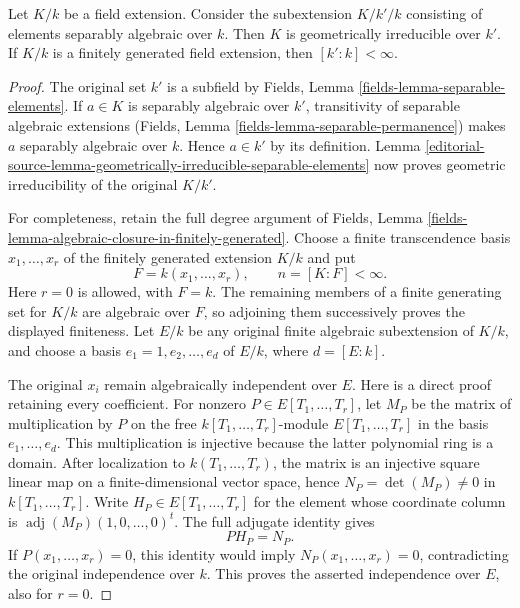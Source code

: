 \begin{lemma}
\label{editorial-source-lemma-make-geometrically-irreducible}
Let $K/k$ be a field extension. Consider the subextension $K/k'/k$ consisting
of elements separably algebraic over $k$. Then $K$ is geometrically irreducible
over $k'$. If $K/k$ is a finitely generated field extension, then
$[k' : k] < \infty$.
\end{lemma}

\begin{proof}
The original set $k'$ is a subfield
by Fields, Lemma \ref{fields-lemma-separable-elements}.
If $a\in K$ is separably algebraic
over $k'$, transitivity of separable
algebraic extensions (Fields, Lemma
\ref{fields-lemma-separable-permanence})
makes $a$ separably algebraic over
$k$. Hence $a\in k'$ by its
definition. Lemma
\ref{editorial-source-lemma-geometrically-irreducible-separable-elements}
now proves geometric irreducibility
of the original $K/k'$.

For completeness, retain the full
degree argument of Fields, Lemma
\ref{fields-lemma-algebraic-closure-in-finitely-generated}.
Choose a finite transcendence basis
$x_1,\ldots,x_r$ of the finitely
generated extension $K/k$ and put
$$
F=k(x_1,\ldots,x_r),\qquad n=[K:F]<\infty.
$$
Here $r=0$ is allowed, with $F=k$.
The remaining members of a finite
generating set for $K/k$ are
algebraic over $F$, so adjoining
them successively proves the
displayed finiteness. Let $E/k$
be any original finite algebraic
subextension of $K/k$, and choose
a basis $e_1=1,e_2,\ldots,e_d$ of
$E/k$, where $d=[E:k]$.

The original $x_i$ remain
algebraically independent over $E$.
Here is a direct proof retaining
every coefficient. For nonzero
$P\in E[T_1,\ldots,T_r]$, let $M_P$
be the matrix of multiplication
by $P$ on the free $k[T_1,\ldots,T_r]$-module
$E[T_1,\ldots,T_r]$ in the basis
$e_1,\ldots,e_d$. This multiplication
is injective because the latter
polynomial ring is a domain.
After localization to $k(T_1,\ldots,T_r)$,
the matrix is an injective square
linear map on a finite-dimensional
vector space, hence
$N_P=\det(M_P)\neq0$ in $k[T_1,\ldots,T_r]$.
Write $H_P\in E[T_1,\ldots,T_r]$
for the element whose coordinate
column is $\operatorname{adj}(M_P)(1,0,\ldots,0)^t$.
The full adjugate identity gives
$$
P H_P=N_P.
$$
If $P(x_1,\ldots,x_r)=0$, this
identity would imply
$N_P(x_1,\ldots,x_r)=0$, contradicting
the original independence over $k$.
This proves the asserted independence
over $E$, also for $r=0$.


\end{proof}
